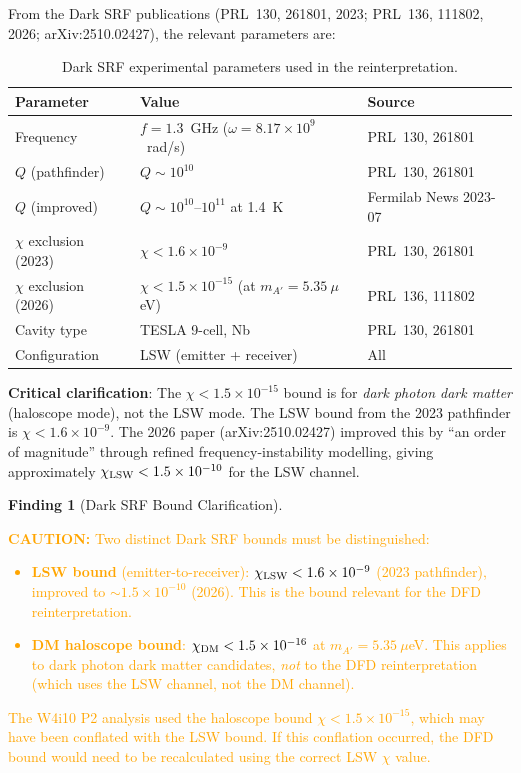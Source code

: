 \documentclass[11pt]{article}
\newcommand{\ee}[1]{\times 10^{#1}}
\newcommand{\caution}[1]{\textcolor{orange}{\textbf{CAUTION:} #1}}
\theoremstyle{definition}
\newtheorem{finding}[theorem]{Finding}
\theoremstyle{remark}
\begin{document}
From the Dark SRF publications (PRL~130, 261801, 2023; PRL~136, 111802,
2026; arXiv:2510.02427), the relevant parameters are:

\begin{table}[H]
\centering
\caption{Dark SRF experimental parameters used in the reinterpretation.}
\label{tab:params}
\renewcommand{\arraystretch}{1.3}
\begin{tabular}{@{}lll@{}}
\toprule
\textbf{Parameter} & \textbf{Value} & \textbf{Source} \\
\midrule
Frequency & $f = 1.3$~GHz ($\omega = 8.17\ee{9}$~rad/s) & PRL~130, 261801 \\
$Q$ (pathfinder) & $Q \sim 10^{10}$ & PRL~130, 261801 \\
$Q$ (improved) & $Q \sim 10^{10}$--$10^{11}$ at 1.4~K
  & Fermilab News 2023-07 \\
$\chi$ exclusion (2023) & $\chi < 1.6\ee{-9}$ & PRL~130, 261801 \\
$\chi$ exclusion (2026) & $\chi < 1.5\ee{-15}$ (at $m_{A'} = 5.35~\mu$eV)
  & PRL~136, 111802 \\
Cavity type & TESLA 9-cell, Nb & PRL~130, 261801 \\
Configuration & LSW (emitter + receiver) & All \\
\bottomrule
\end{tabular}
\end{table}

\textbf{Critical clarification}: The $\chi < 1.5\ee{-15}$ bound is
for \emph{dark photon dark matter} (haloscope mode), not the LSW mode.
The LSW bound from the 2023 pathfinder is $\chi < 1.6\ee{-9}$. The
2026 paper (arXiv:2510.02427) improved this by ``an order of magnitude''
through refined frequency-instability modelling, giving approximately
$\chi_{\rm LSW} < 1.5\ee{-10}$ for the LSW channel.

\begin{finding}[Dark SRF Bound Clarification]
\label{find:chi_clarification}
\caution{Two distinct Dark SRF bounds must be distinguished:
\begin{itemize}[nosep]
\item \textbf{LSW bound} (emitter-to-receiver): $\chi_{\rm LSW} <
  1.6\ee{-9}$ (2023 pathfinder), improved to $\sim 1.5\ee{-10}$ (2026).
  This is the bound relevant for the DFD reinterpretation.
\item \textbf{DM haloscope bound}: $\chi_{\rm DM} < 1.5\ee{-16}$ at
  $m_{A'} = 5.35~\mu$eV. This applies to dark photon dark matter
  candidates, \emph{not} to the DFD reinterpretation (which uses
  the LSW channel, not the DM channel).
\end{itemize}

The W4i10 P2 analysis used the haloscope bound $\chi < 1.5\ee{-15}$,
which may have been conflated with the LSW bound. If this conflation
occurred, the DFD bound would need to be recalculated using the
correct LSW $\chi$ value.}
\end{finding}
\end{document}
